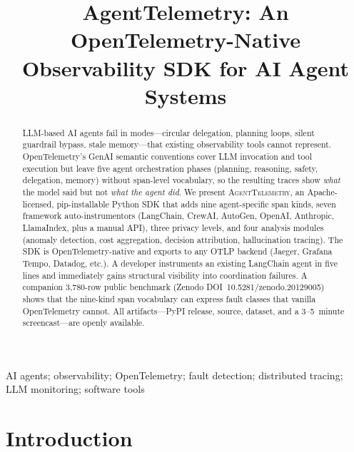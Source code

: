 \documentclass[10pt,conference]{IEEEtran}
\begin{document}
\title{AgentTelemetry: An OpenTelemetry-Native\\Observability SDK for AI Agent Systems}

\author{
}

\maketitle

\begin{abstract}
LLM-based AI agents fail in modes---circular delegation, planning
loops, silent guardrail bypass, stale memory---that existing
observability tools cannot represent. OpenTelemetry's GenAI semantic
conventions cover LLM invocation and tool execution but leave five
agent orchestration phases (planning, reasoning, safety,
delegation, memory) without span-level vocabulary, so the resulting
traces show \emph{what} the model said but not \emph{what the agent did}.
We present \textsc{AgentTelemetry}, an Apache-licensed,
pip-installable Python SDK that adds nine agent-specific span
kinds, seven framework auto-instrumentors (LangChain, CrewAI,
AutoGen, OpenAI, Anthropic, LlamaIndex, plus a manual API), three
privacy levels, and four analysis modules
(anomaly detection, cost aggregation, decision attribution,
hallucination tracing). The SDK is OpenTelemetry-native and exports
to any OTLP backend (Jaeger, Grafana Tempo, Datadog, etc.). A
developer instruments an existing LangChain agent in five lines and
immediately gains structural visibility into coordination failures.
A companion 3{,}780-row public benchmark (Zenodo
DOI~10.5281/zenodo.20129005) shows that the nine-kind span
vocabulary can express fault classes that vanilla OpenTelemetry
cannot. All artifacts---PyPI release, source, dataset, and a
3--5~minute screencast---are openly available.
\end{abstract}

\begin{IEEEkeywords}
AI agents; observability; OpenTelemetry; fault detection;
distributed tracing; LLM monitoring; software tools
\end{IEEEkeywords}

\section{Introduction}
\label{sec:intro}
\end{document}
